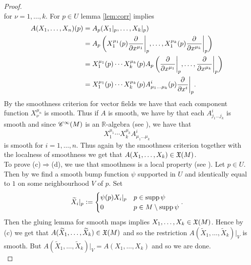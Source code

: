 \begin{appendix}
\begin{proof}
\begin{equation*}
\end{equation*}
\noindent for $\nu = 1,\dots,k$. For $p \in U$ lemma \ref{lem:corr} implies
\begin{align*}
A(X_1,\dots,X_n)(p) &= A_p(X_1\vert_p,\dots,X_k\vert_p)\\
&= A_p\del[3]{X^{\mu_1}_1(p) \frac{\partial}{\partial x^{\mu_1}}\bigg\vert_p,\dots,X^{\mu_k}_1(p) \frac{\partial}{\partial x^{\mu_k}}\bigg\vert_p}\\
&= X^{\mu_1}_1(p) \cdots X^{\mu_k}_k(p)A_p\del[3]{\frac{\partial}{\partial x^{\mu_1}}\bigg\vert_p,\dots,\frac{\partial}{\partial x^{\mu_k}}\bigg\vert_p}\\
&= X^{\mu_1}_1(p) \cdots X^{\mu_k}_k(p) A^i_{\mu_1 \dots \mu_k}(p)\frac{\partial}{\partial x^i}\bigg\vert_p.
\end{align*}
By the smoothness criterion for vector fields \cite[175]{lee:smooth_manifolds:2013} we have that each component function $X^{\mu_n}_\nu$ is smooth. Thus if $A$ is smooth, we have by  that each $A^i_{j_1\dots j_k}$ is smooth and since $\mathscr{C}^\infty(M)$ is an $\mathbb{R}$-algebra (see \cite[33]{lee:smooth_manifolds:2013}), we have that 
\begin{equation*}
X^{\mu_1}_1 \cdots X^{\mu_k}_k A^i_{\mu_1 \dots \mu_k}
\end{equation*} 
\noindent is smooth for $i = 1,\dots,n$. Thus again by the smoothness criterion together with the localness of smoothness \cite[35]{lee:smooth_manifolds:2013} we get that $A(X_1,\dots,X_k) \in \mathfrak{X}(M)$.\\
To prove (c)$\Rightarrow$(d), we use that smoothness is a local property (see \cite[35]{lee:smooth_manifolds:2013}). Let $p \in U$.  Then by \cite[14]{cattaneo:manifolds:2017} we find a smooth bump function $\psi$ supported in $U$ and identically equal to $1$ on some neighbourhood $V$ of $p$. Set 
\begin{align*}
\widetilde{X}_i\vert_p := \begin{cases}
\psi(p) X_i\vert_p & p \in \operatorname{supp} \psi\\
0 & p \in M \setminus \operatorname{supp} \psi
\end{cases}.
\end{align*}
Then the gluing lemma for smooth maps \cite[35]{lee:smooth_manifolds:2013} implies $X_1,\dots,X_k \in \mathfrak{X}(M)$. Hence by (c) we get that $A(\widetilde{X}_1,\dots,\widetilde{X}_k) \in \mathfrak{X}(M)$ and so the restriction $A(\widetilde{X}_1,\dots,\widetilde{X}_k)\vert_V$ is smooth. But $A(\widetilde{X}_1,\dots,\widetilde{X}_k)\vert_V = A(X_1,\dots,X_k)$ and so we are done.\\

\end{proof}
\end{appendix}
